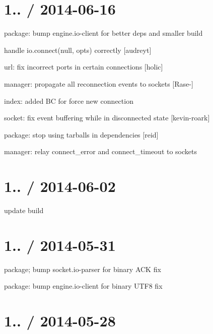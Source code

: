 \section*{1.. / 2014-\/06-\/16 }


\begin{DoxyItemize}
\item package\+: bump {\ttfamily engine.\+io-\/client} for better deps and smaller build
\item handle io.\+connect(null, opts) correctly \mbox{[}audreyt\mbox{]}
\item url\+: fix incorrect ports in certain connections \mbox{[}holic\mbox{]}
\item manager\+: propagate all reconnection events to sockets \mbox{[}Rase-\/\mbox{]}
\item index\+: added BC for {\ttfamily force new connection}
\item socket\+: fix event buffering while in disconnected state \mbox{[}kevin-\/roark\mbox{]}
\item package\+: stop using tarballs in dependencies \mbox{[}reid\mbox{]}
\item manager\+: relay {\ttfamily connect\+\_\+error} and {\ttfamily connect\+\_\+timeout} to sockets
\end{DoxyItemize}

\section*{1.. / 2014-\/06-\/02 }


\begin{DoxyItemize}
\item update build
\end{DoxyItemize}

\section*{1.. / 2014-\/05-\/31 }


\begin{DoxyItemize}
\item package; bump {\ttfamily socket.\+io-\/parser} for binary A\+CK fix
\item package\+: bump {\ttfamily engine.\+io-\/client} for binary U\+T\+F8 fix
\end{DoxyItemize}

\section*{1.. / 2014-\/05-\/28 }


